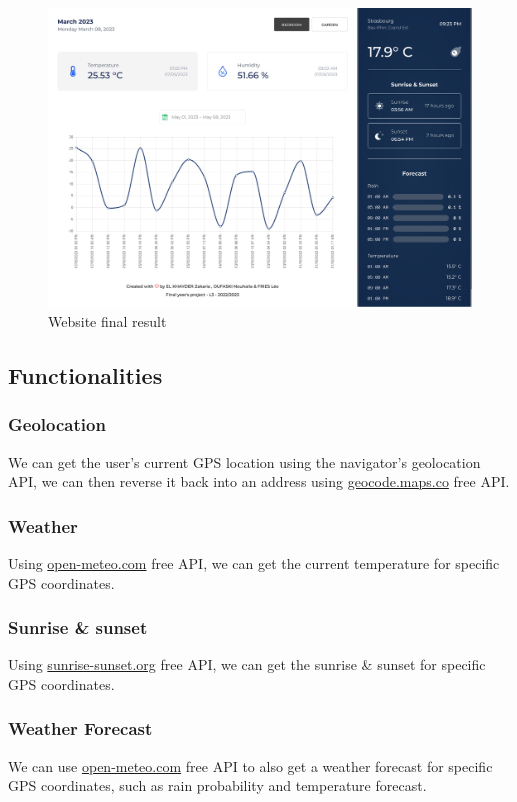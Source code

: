\begin{figure}[H]
    \centering
    \includegraphics[width=\textwidth]{images/website/final_design.jpg}
    \caption{Website final result}
\end{figure}

\subsection{Functionalities}

\subsubsection{Geolocation}
We can get the user's current GPS location using the navigator's geolocation API, we can then reverse it back into an address using \href{https://geocode.maps.co}{geocode.maps.co} free API.

\subsubsection{Weather}
Using \href{https://open-meteo.com}{open-meteo.com} free API, we can get the current temperature for specific GPS coordinates.

\subsubsection{Sunrise \& sunset}
Using \href{https://sunrise-sunset.org}{sunrise-sunset.org} free API, we can get the sunrise \& sunset for specific GPS coordinates.

\subsubsection{Weather Forecast}
We can use \href{https://open-meteo.com}{open-meteo.com} free API to also get a weather forecast for specific GPS coordinates, such as rain probability and temperature forecast.

